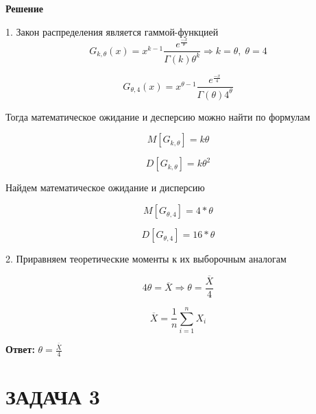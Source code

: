 \documentclass[12pt, a4paper]{report}
\begin{document}
	
	\vspace{0.2cm}
	\textbf{Решение}
	
	
	\vspace{0.2cm}
	1. Закон распределения является гаммой-функцией 
	\begin{equation*} 
	G_{k, \theta}(x) = x^{k-1} \frac{e^{\frac{-x}{\theta}}}{\Gamma(k)\theta^k} \Rightarrow k = \theta,\; \theta = 4
	\end{equation*} 
	
	\begin{equation*} 
	G_{\theta, 4}(x) = x^{\theta-1} \frac{e^{\frac{-x}{4}}}{\Gamma(\theta)4^\theta} 
	\end{equation*} 
	
	Тогда математическое ожидание и десперсию можно найти по формулам 
	
	\begin{equation*} 
	 M[G_{k ,\theta}] = k \theta
	\end{equation*} 
	
	\begin{equation*} 
	D[G_{k ,\theta}] = k \theta^2
	\end{equation*} 
	
	Найдем математическое ожидание и дисперсию
	
	\begin{equation*} 
	M[G_{\theta ,4}] =  4 * \theta
	\end{equation*}  
	
	\begin{equation*} 
	D[G_{\theta ,4}] = 16 * \theta
	\end{equation*}  
	
	
	\vspace{0.2cm}
	2. Приравняем теоретические моменты к их выборочным аналогам
	
	\begin{equation*} 
	4 \theta = \overline{X} \Rightarrow \theta = \frac{\overline{X}}{4}
	\end{equation*}  
	
	\begin{equation*} 
	\overline{X} = \frac{1}{n} \sum_{i=1}^n X_i
	\end{equation*} 
	
	\vspace{0.5cm}
	\textbf{Ответ:} $\theta = \frac{\overline{X}}{4}$
	

	
	\newpage
	
	\section{ЗАДАЧА 3}
	
\end{document}
